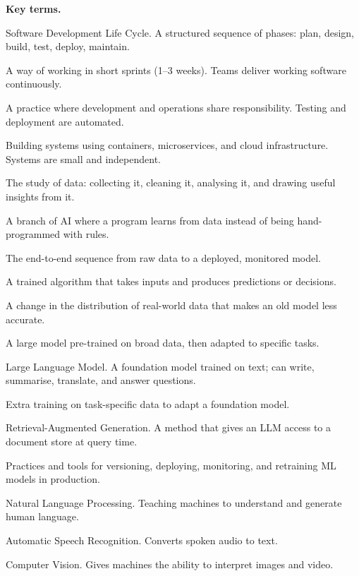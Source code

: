 \documentclass[a4paper,11pt]{article}
\begin{document}
\noindent\textbf{Key terms.}
\begin{description}[leftmargin=9em,style=nextline,font=\normalfont\bfseries\color{navy}]
  \item[SDLC] Software Development Life Cycle. A structured sequence of phases: plan, design, build, test, deploy, maintain.
  \item[Agile] A way of working in short sprints (1--3 weeks). Teams deliver working software continuously.
  \item[DevOps] A practice where development and operations share responsibility. Testing and deployment are automated.
  \item[Cloud Native] Building systems using containers, microservices, and cloud infrastructure. Systems are small and independent.
  \item[Data Science] The study of data: collecting it, cleaning it, analysing it, and drawing useful insights from it.
  \item[Machine Learning] A branch of AI where a program learns from data instead of being hand-programmed with rules.
  \item[ML Pipeline] The end-to-end sequence from raw data to a deployed, monitored model.
  \item[Model] A trained algorithm that takes inputs and produces predictions or decisions.
  \item[Data Drift] A change in the distribution of real-world data that makes an old model less accurate.
  \item[Foundation Model] A large model pre-trained on broad data, then adapted to specific tasks.
  \item[LLM] Large Language Model. A foundation model trained on text; can write, summarise, translate, and answer questions.
  \item[Fine-tuning] Extra training on task-specific data to adapt a foundation model.
  \item[RAG] Retrieval-Augmented Generation. A method that gives an LLM access to a document store at query time.
  \item[MLOps] Practices and tools for versioning, deploying, monitoring, and retraining ML models in production.
  \item[NLP] Natural Language Processing. Teaching machines to understand and generate human language.
  \item[ASR] Automatic Speech Recognition. Converts spoken audio to text.
  \item[CV] Computer Vision. Gives machines the ability to interpret images and video.
\end{description}
\end{document}
